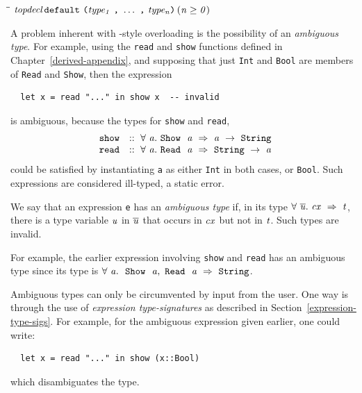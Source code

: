 \begin{flushleft}\it\begin{tabbing}
\hspace{0.6in}\=\hspace{3.1in}\=\kill
$\it topdecl$\>\makebox[3.5em]{$\rightarrow$}$\it \makebox{\tt default}\ \makebox{\tt (}type_1\ \makebox{\tt ,}\ \ldots \ \makebox{\tt ,}\ type_n\makebox{\tt )}$\>\makebox[3em]{}$\it (n\geq 0)$
\end{tabbing}\end{flushleft}

\noindent
A problem inherent with \Haskell{}-style overloading is the
possibility of an {\em ambiguous type}.
For example, using the
\mbox{\tt read} and \mbox{\tt show} functions defined in Chapter~\ref{derived-appendix},
and supposing that just \mbox{\tt Int} and \mbox{\tt Bool} are members of \mbox{\tt Read} and
\mbox{\tt Show}, then the expression
\bprog
{\small\begin{verbatim}
  let x = read "..." in show x  -- invalid
\end{verbatim}}
\eprog
is ambiguous, because the types for \mbox{\tt show} and \mbox{\tt read},
\[\ba{ll}
\mbox{\tt show} & \mbox{$\it ::\ \forall\ a.~\makebox{\tt Show}~\ a\ \Rightarrow\ a\ \rightarrow\ \makebox{\tt String}$} \\
\mbox{\tt read} & \mbox{$\it ::\ \forall\ a.~\makebox{\tt Read}~\ a\ \Rightarrow\ \makebox{\tt String}\ \rightarrow\ a$}
\ea\]
could be satisfied by instantiating \mbox{\tt a} as either \mbox{\tt Int}
in both cases, or \mbox{\tt Bool}.  Such expressions
are considered ill-typed, a static error.

We say that an expression \mbox{\tt e} has an {\em ambiguous type}
if, in its type \mbox{$\it \forall\ \overline{u}.~cx\ \Rightarrow\ t$}, 
there is a type variable \mbox{$\it u$} in \mbox{$\it \overline{u}$} that occurs in \mbox{$\it cx$} 
but not in \mbox{$\it t$}.  Such types are invalid.

For example, the earlier expression involving \mbox{\tt show} and \mbox{\tt read} has
an ambiguous type since its type is 
\mbox{$\it \forall\ a.~\ \makebox{\tt Show}~\ a,\ \makebox{\tt Read}~\ a\ \Rightarrow\ \makebox{\tt String}$}.

Ambiguous types can only be circumvented by
input from the user.  One way is through the use of {\em expression
type-signatures}
as described in Section~\ref{expression-type-sigs}.
For example, for the ambiguous expression given earlier, one could
write:
\bprog
{\small\begin{verbatim}
  let x = read "..." in show (x::Bool)
\end{verbatim}}
\eprog
which disambiguates the type.


